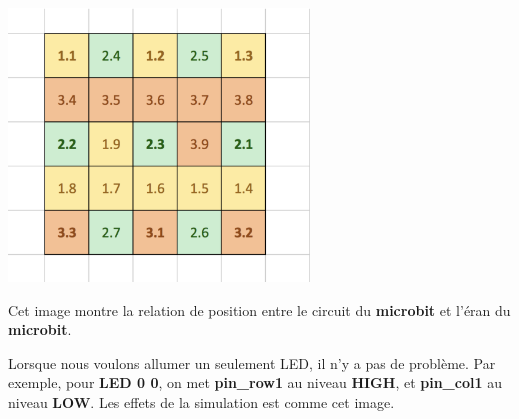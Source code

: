 \documentclass[14px]{article}
\begin{document}
\centering
\includegraphics[width=0.6\textwidth]{matrice_Pins.png}

Cet image montre la relation de position entre le circuit du  \textbf{microbit} et l'éran du \textbf{microbit}.\\

\clearpage

Lorsque nous voulons allumer un seulement LED, il n'y a pas de problème. Par exemple, pour \textbf{LED 0 0}, on met \textbf{pin\_row1} au niveau \textbf{HIGH}, et \textbf{pin\_col1} au niveau \textbf{LOW}. Les effets de la simulation est comme cet image.
\begin{figure}[htbp]
\end{figure}
\end{document}
